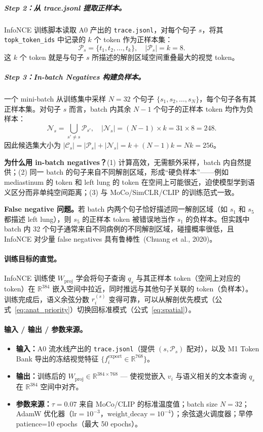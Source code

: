 \documentclass[11pt,a4paper]{article}
\newcommand{\RR}{\mathbb{R}}
\theoremstyle{definition}
\begin{document}
\subparagraph{Step 2：从 trace.jsonl 提取正样本。}
InfoNCE 训练脚本读取 A0 产出的 \texttt{trace.jsonl}，对每个句子 $s$，将其 \texttt{topk\_token\_ids} 中记录的 $k$ 个 token 作为正样本集：
\[
\mathcal{P}_s = \{t_1, t_2, \ldots, t_k\}, \quad |\mathcal{P}_s| = k = 8.
\]
这 $k$ 个 token 就是与句子 $s$ 所描述的解剖区域空间重叠最大的视觉 token。

\subparagraph{Step 3：In-batch Negatives 构建负样本。}
一个 mini-batch 从训练集中采样 $N=32$ 个句子 $\{s_1, s_2, \ldots, s_N\}$，每个句子各有其正样本集。对句子 $s$ 而言，batch 内其余 $N-1$ 个句子的正样本 token 均作为负样本：
\[
\mathcal{N}_s = \bigcup_{s' \neq s} \mathcal{P}_{s'}, \quad
|\mathcal{N}_s| = (N-1) \times k = 31 \times 8 = 248.
\]
因此候选集大小为 $|\mathcal{C}_s| = |\mathcal{P}_s| + |\mathcal{N}_s| = k + (N-1)k = Nk = 256$。

\textbf{为什么用 in-batch negatives？}(1) 计算高效，无需额外采样，batch 内自然提供；(2) 同一 batch 的句子来自不同解剖区域，形成``硬负样本''——例如 mediastinum 的 token 和 left lung 的 token 在空间上可能很近，迫使模型学到语义区分而非单纯空间距离；(3) 与 MoCo/SimCLR/CLIP 的训练范式一致。

\textbf{False negative 问题。}若 batch 内两个句子恰好描述同一解剖区域（如 $s_1$ 和 $s_5$ 都描述 left lung），则 $s_5$ 的正样本 token 被错误地当作 $s_1$ 的负样本。但实践中 batch 内 32 个句子通常来自不同病例的不同解剖区域，碰撞概率很低，且 InfoNCE 对少量 false negatives 具有鲁棒性~(Chuang et al., 2020)。

\paragraph{训练目标的直觉。}
InfoNCE 训练使 $W_{\mathrm{proj}}$ 学会将句子查询 $q_s$ 与其正样本 token（空间上对应的 token）在 $\RR^{384}$ 嵌入空间中拉近，同时推远与其他句子关联的 token（负样本）。训练完成后，语义余弦分数 $r_i^{(s)}$ 变得可靠，可以从解剖优先模式（公式~\ref{eq:anat_priority}）切换回标准模式（公式~\ref{eq:spatial}）。

\paragraph{输入 / 输出 / 参数来源。}
\begin{itemize}[nosep]
    \item \textbf{输入：}A0 流水线产出的 \texttt{trace.jsonl}（提供 $(s, \mathcal{P}_s)$ 配对），以及 M1 Token Bank 导出的冻结视觉特征 $\{f_i^{\mathrm{export}} \in \RR^{768}\}$。
    \item \textbf{输出：}训练后的 $W_{\mathrm{proj}} \in \RR^{384 \times 768}$ — 使视觉嵌入 $v_i$ 与语义相关的文本查询 $q_s$ 在 $\RR^{384}$ 空间中对齐。
    \item \textbf{参数来源：}$\tau = 0.07$ 来自 MoCo/CLIP 的标准温度值；batch size $N=32$；AdamW 优化器（$\mathrm{lr}=10^{-3}$，$\mathrm{weight\_decay}=10^{-4}$）；余弦退火调度器；早停 patience=10 epochs（最大 50 epochs）。
\end{itemize}
\end{document}
